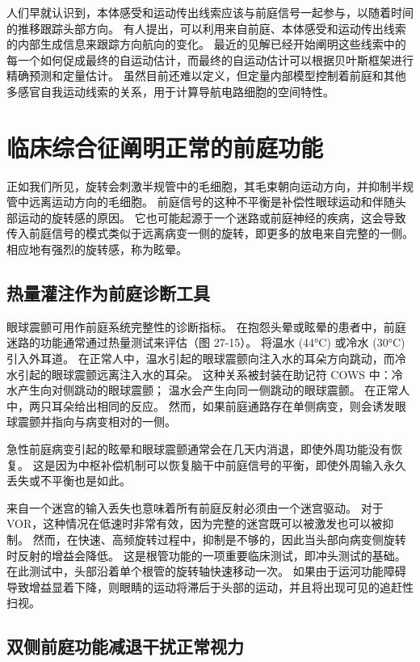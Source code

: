 人们早就认识到，本体感受和运动传出线索应该与前庭信号一起参与，以随着时间的推移跟踪头部方向。 有人提出，可以利用来自前庭、本体感受和运动传出线索的内部生成信息来跟踪方向航向的变化。 最近的见解已经开始阐明这些线索中的每一个如何促成最终的自运动估计，而最终的自运动估计可以根据贝叶斯框架进行精确预测和定量估计。 虽然目前还难以定义，但定量内部模型控制着前庭和其他多感官自我运动线索的关系，用于计算导航电路细胞的空间特性。




\section{临床综合征阐明正常的前庭功能}
正如我们所见，旋转会刺激半规管中的毛细胞，其毛束朝向运动方向，并抑制半规管中远离运动方向的毛细胞。 前庭信号的这种不平衡是补偿性眼球运动和伴随头部运动的旋转感的原因。 它也可能起源于一个迷路或前庭神经的疾病，这会导致传入前庭信号的模式类似于远离病变一侧的旋转，即更多的放电来自完整的一侧。 相应地有强烈的旋转感，称为眩晕。

\subsection{热量灌注作为前庭诊断工具}
眼球震颤可用作前庭系统完整性的诊断指标。 在抱怨头晕或眩晕的患者中，前庭迷路的功能通常通过热量测试来评估（图 27-15）。 将温水 (44°C) 或冷水 (30°C) 引入外耳道。 在正常人中，温水引起的眼球震颤向注入水的耳朵方向跳动，而冷水引起的眼球震颤远离注入水的耳朵。 这种关系被封装在助记符 COWS 中：冷水产生向对侧跳动的眼球震颤； 温水会产生向同一侧跳动的眼球震颤。 在正常人中，两只耳朵给出相同的反应。 然而，如果前庭通路存在单侧病变，则会诱发眼球震颤并指向与病变相对的一侧。

急性前庭病变引起的眩晕和眼球震颤通常会在几天内消退，即使外周功能没有恢复。 这是因为中枢补偿机制可以恢复脑干中前庭信号的平衡，即使外周输入永久丢失或不平衡也是如此。

来自一个迷宫的输入丢失也意味着所有前庭反射必须由一个迷宫驱动。 对于 VOR，这种情况在低速时非常有效，因为完整的迷宫既可以被激发也可以被抑制。 然而，在快速、高频旋转过程中，抑制是不够的，因此当头部向病变侧旋转时反射的增益会降低。 这是根管功能的一项重要临床测试，即冲头测试的基础。 在此测试中，头部沿着单个根管的旋转轴快速移动一次。 如果由于运河功能障碍导致增益显着下降，则眼睛的运动将滞后于头部的运动，并且将出现可见的追赶性扫视。



\subsection{双侧前庭功能减退干扰正常视力}

